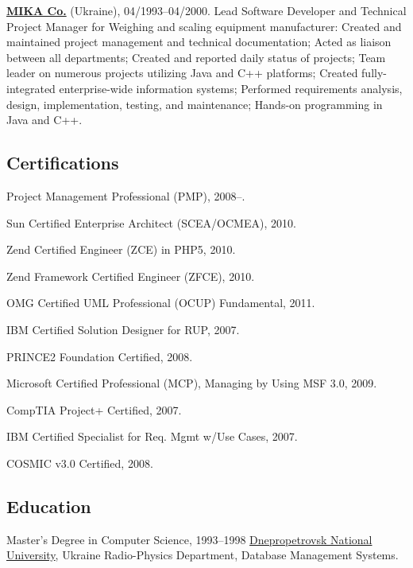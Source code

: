\documentclass{yb}
\begin{document}
    \textbf{\href{https://www.mika.ua}{MIKA Co.}} (Ukraine), 04/1993--04/2000.
    Lead Software Developer and Technical Project Manager for Weighing and scaling equipment manufacturer:
    Created and maintained project management and technical documentation;
    Acted as liaison between all departments;
    Created and reported daily status of projects;
    Team leader on numerous projects utilizing Java and C++ platforms;
    Created fully-integrated enterprise-wide information systems;
    Performed requirements analysis, design, implementation, testing, and maintenance;
    Hands-on programming in Java and C++.

    \subsection*{Certifications}

    Project Management Professional (PMP), 2008--.

    Sun Certified Enterprise Architect (SCEA/OCMEA), 2010.

    Zend Certified Engineer (ZCE) in PHP5, 2010.

    Zend Framework Certified Engineer (ZFCE), 2010.

    OMG Certified UML Professional (OCUP) Fundamental, 2011.

    IBM Certified Solution Designer for RUP, 2007.

    PRINCE2 Foundation Certified, 2008.

    Microsoft Certified Professional (MCP), Managing by Using MSF 3.0, 2009.

    CompTIA Project+ Certified, 2007.

    IBM Certified Specialist for Req. Mgmt w/Use Cases, 2007.

    COSMIC v3.0 Certified, 2008.

    \subsection*{Education}

    \begin{samepage}
        Master's Degree in Computer Science, 1993--1998\newline
        \href{http://dnu.dp.ua/}{Dnepropetrovsk National University}, Ukraine\newline
        Radio-Physics Department, Database Management Systems.
    \end{samepage}
\end{document}
